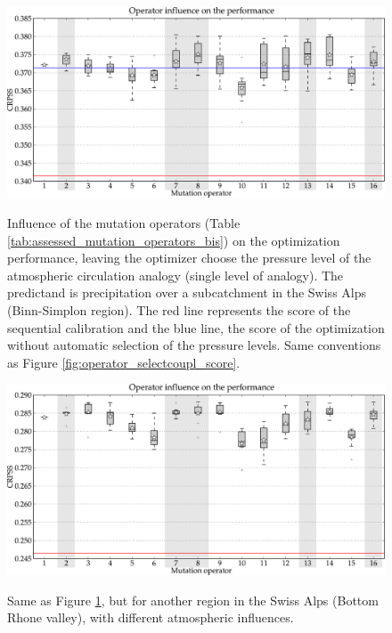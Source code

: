 \documentclass{ametsoc}
\begin{document}
\begin{figure}[t]
	\begin{center}
		\noindent\includegraphics[width=14cm,angle=0]{figures/operator_mutation_score_atmlevel.pdf}\\
	\end{center}
	\caption{Influence of the mutation operators (Table \ref{tab:assessed_mutation_operators_bis}) on the optimization performance, leaving the optimizer choose the pressure level of the atmospheric circulation analogy (single level of analogy). The predictand is precipitation over a subcatchment in the Swiss Alps (Binn-Simplon region). The red line represents the score of the sequential calibration and the blue line, the score of the optimization without automatic selection of the pressure levels. Same conventions as Figure \ref{fig:operator_selectcoupl_score}.}
	\label{fig:operator_mutation_score_atmlevel}
\end{figure}

\begin{figure}[t]
	\begin{center}
		\noindent\includegraphics[width=14cm,angle=0]{figures/operator_mutation_score_rhoneamont.pdf}\\
	\end{center}
	\caption{Same as Figure \ref{fig:operator_mutation_score_atmlevel}, but for another region in the Swiss Alps (Bottom Rhone valley), with different atmospheric influences.}
	\label{fig:operator_mutation_score_rhoneamont}
\end{figure}
\end{document}

